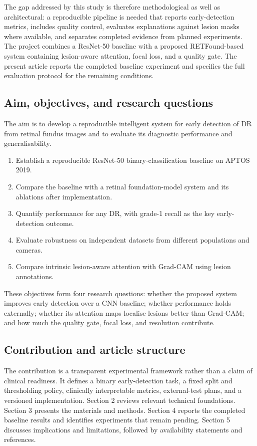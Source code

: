 \documentclass[11pt,a4paper]{article}
\newcommand{\aptos}{APTOS 2019}
\begin{document}
The gap addressed by this study is therefore methodological as well as architectural: a reproducible pipeline is needed that reports early-detection metrics, includes quality control, evaluates explanations against lesion masks where available, and separates completed evidence from planned experiments. The project combines a ResNet-50 baseline with a proposed RETFound-based system containing lesion-aware attention, focal loss, and a quality gate. The present article reports the completed baseline experiment and specifies the full evaluation protocol for the remaining conditions.

\subsection{Aim, objectives, and research questions}
The aim is to develop a reproducible intelligent system for early detection of DR from retinal fundus images and to evaluate its diagnostic performance and generalisability.
\begin{enumerate}[leftmargin=2em]
\item Establish a reproducible ResNet-50 binary-classification baseline on \aptos.
\item Compare the baseline with a retinal foundation-model system and its ablations after implementation.
\item Quantify performance for any DR, with grade-1 recall as the key early-detection outcome.
\item Evaluate robustness on independent datasets from different populations and cameras.
\item Compare intrinsic lesion-aware attention with Grad-CAM using lesion annotations.
\end{enumerate}
These objectives form four research questions: whether the proposed system improves early detection over a CNN baseline; whether performance holds externally; whether its attention maps localise lesions better than Grad-CAM; and how much the quality gate, focal loss, and resolution contribute.

\subsection{Contribution and article structure}
The contribution is a transparent experimental framework rather than a claim of clinical readiness. It defines a binary early-detection task, a fixed split and thresholding policy, clinically interpretable metrics, external-test plans, and a versioned implementation. Section 2 reviews relevant technical foundations. Section 3 presents the materials and methods. Section 4 reports the completed baseline results and identifies experiments that remain pending. Section 5 discusses implications and limitations, followed by availability statements and references.
\end{document}
